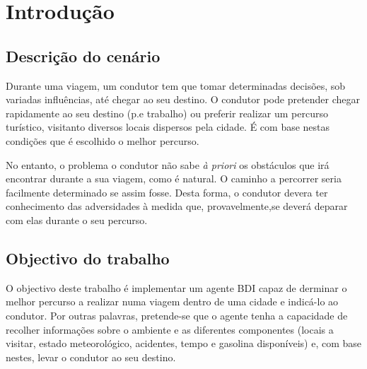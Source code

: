 \documentclass[15pt,a4paper]{article}
\begin{document}

\newpage

\tableofcontents



\newpage


\section{Introdução}

\subsection{Descrição do cenário}
Durante uma viagem, um condutor tem que tomar determinadas decisões, sob variadas influências, até chegar ao seu destino. O condutor pode pretender chegar rapidamente ao seu destino (p.e trabalho) ou preferir realizar um percurso turístico, visitanto diversos locais dispersos pela cidade. É com base nestas condições que é escolhido o melhor percurso.

No entanto, o problema o condutor não sabe \textit{à priori} os obstáculos que irá encontrar durante a sua viagem, como é natural. O caminho a percorrer seria facilmente determinado se assim fosse. Desta forma, o condutor devera ter conhecimento das adversidades à medida que, provavelmente,se deverá deparar com elas durante o seu percurso.

\subsection{Objectivo do trabalho}

O objectivo deste trabalho é implementar um agente BDI capaz de derminar o melhor percurso a realizar numa viagem dentro de uma cidade e indicá-lo ao condutor. Por outras palavras, pretende-se que o agente tenha a capacidade de recolher informações sobre o ambiente e as diferentes componentes (locais a visitar, estado meteorológico, acidentes, tempo e gasolina disponíveis) e, com base nestes, levar o condutor ao seu destino.
\end{document}
